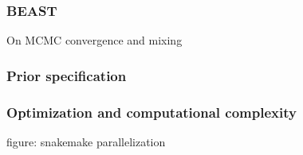       \subsubsection{BEAST}
      On MCMC convergence and mixing
      \subsubsection{Prior specification}
      \subsubsection{Optimization and computational complexity}
      figure: snakemake parallelization



